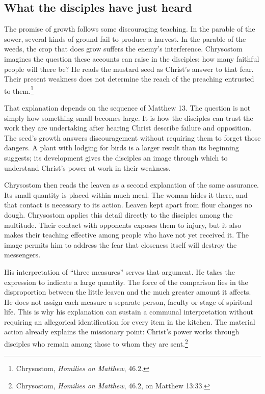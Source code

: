 
\subsection{What the disciples have just heard}

The promise of growth follows some discouraging teaching. In the parable of the sower, several kinds of ground fail to produce a harvest. In the parable of the weeds, the crop that does grow suffers the enemy's interference. Chrysostom imagines the question these accounts can raise in the disciples: how many faithful people will there be? He reads the mustard seed as Christ's answer to that fear. Their present weakness does not determine the reach of the preaching entrusted to them.\footnote{Chrysostom, \textit{Homilies on Matthew}, 46.2.}

That explanation depends on the sequence of Matthew 13. The question is not simply how something small becomes large. It is how the disciples can trust the work they are undertaking after hearing Christ describe failure and opposition. The seed's growth answers discouragement without requiring them to forget those dangers. A plant with lodging for birds is a larger result than its beginning suggests; its development gives the disciples an image through which to understand Christ's power at work in their weakness.

Chrysostom then reads the leaven as a second explanation of the same assurance. Its small quantity is placed within much meal. The woman hides it there, and that contact is necessary to its action. Leaven kept apart from flour changes no dough. Chrysostom applies this detail directly to the disciples among the multitude. Their contact with opponents exposes them to injury, but it also makes their teaching effective among people who have not yet received it. The image permits him to address the fear that closeness itself will destroy the messengers.

His interpretation of ``three measures'' serves that argument. He takes the expression to indicate a large quantity. The force of the comparison lies in the disproportion between the little leaven and the much greater amount it affects. He does not assign each measure a separate person, faculty or stage of spiritual life. This is why his explanation can sustain a communal interpretation without requiring an allegorical identification for every item in the kitchen. The material action already explains the missionary point: Christ's power works through disciples who remain among those to whom they are sent.\footnote{Chrysostom, \textit{Homilies on Matthew}, 46.2, on Matthew 13:33.}

